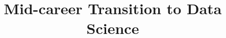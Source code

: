 \documentclass[xcolor=dvipsnames,compress,t,pdf,9pt]{beamer}
\title[\insertframenumber /\inserttotalframenumber]{Mid-career Transition to Data Science}
\begin{document}
	\begin{frame}
	\titlepage
%
	\end{frame}
	
	

	
\end{document}
